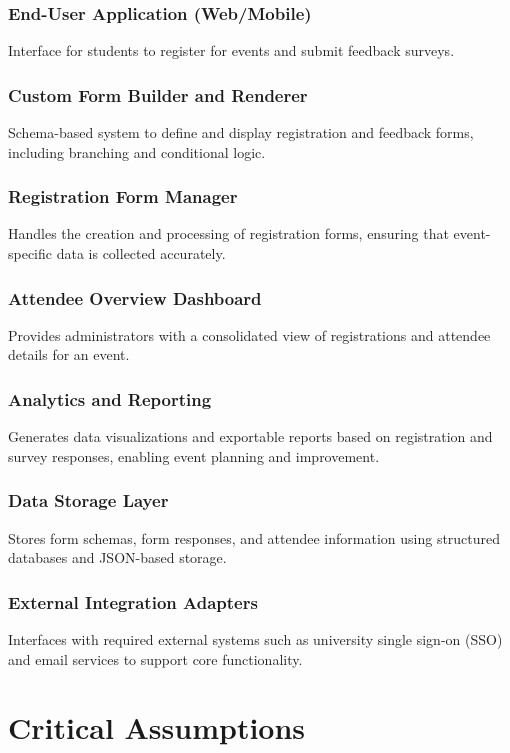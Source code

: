 \documentclass[12pt]{article}
\begin{document}
\subsubsection{End-User Application (Web/Mobile)}
Interface for students to register for events and submit feedback surveys.

\subsubsection{Custom Form Builder and Renderer}
Schema-based system to define and display registration and feedback forms, including branching and conditional logic.

\subsubsection{Registration Form Manager}
Handles the creation and processing of registration forms, ensuring that event-specific data is collected accurately.

\subsubsection{Attendee Overview Dashboard}
Provides administrators with a consolidated view of registrations and attendee details for an event.

\subsubsection{Analytics and Reporting}
Generates data visualizations and exportable reports based on registration and survey responses, enabling event planning and improvement.

\subsubsection{Data Storage Layer}
Stores form schemas, form responses, and attendee information using structured databases and JSON-based storage.

\subsubsection{External Integration Adapters}
Interfaces with required external systems such as university single sign-on (SSO) and email services to support core functionality.




\section{Critical Assumptions}
\end{document}
